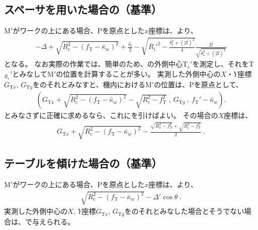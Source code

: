 \subsection{スペーサを用いた場合の\KeywayCenter（\CurvatureCenter 基準）}
\KeywayCenter M$'$がワークの\CenterCurvatureLine 上にある場合、\TableCenter Pを原点とした$x$座標は、より、
\begin{align*}
  -\Delta+\sqrt{R_\mathrm c^2-(f_\mathrm T-\bar\kappa_w)^2}+\frac{\delta_\mathrm s}2
  -\sqrt{R_\mathrm i'^2-\frac{\delta_\mathrm s^2+(2\bar l)^2}4}\frac{2\bar l}{\sqrt{\delta_\mathrm s^2+\left(2\bar l\right)^2}}
\end{align*}
となる。
なお実際の作業では、簡単のため、\TopEndFace の外側中心T$_\mathrm c'$を測定し、それを\TopCurvatureCenter T$_{R_\mathrm c}'$とみなして\KeywayCenter M$'$の位置を計算することが多い。
実測した外側中心の$X$・$Y$座標$G_{\mathrm Tx}$, $G_{\mathrm Ty}$を\TopCurvatureCenter のそれとみなすと、機内における\KeywayCenter M$'$の位置は、\TableCenter Pを原点として、
\begin{align*}
  \left(
    G_{\mathrm Tx}
    +\sqrt{R_\mathrm c^2-(f_\mathrm T-\bar\kappa_w)^2}
    -\sqrt{R_\mathrm c^2-f_\mathrm T^2}\ ,\
    G_{\mathrm Ty}~,~
    f_\mathrm T'-\bar\kappa_w
  \right).
\end{align*}
\TopCurvatureCenter とみなさずに正確に求めるなら、これにを引けばよい。
その場合の$X$座標は、
\begin{align}
  \label{eq:Mreal}
  G_{\mathrm Tx}
  +\sqrt{R_\mathrm c^2-(f_\mathrm T-\bar\kappa_w)^2}
  -\frac{\sqrt{R_\mathrm o^2-f_\mathrm T^2}+\sqrt{R_\mathrm i^2-f_\mathrm T^2}}2\ .
\end{align}


\subsection{テーブルを傾けた場合の\KeywayCenter（\CurvatureCenter 基準）}
\KeywayCenter M$'$がワークの\CenterCurvatureLine 上にある場合、\TableCenter Pを原点とした$x$座標は、より、
\begin{align*}
  \sqrt{R_\mathrm c^2-(f_\mathrm T-\bar\kappa_w)^2}
  -\Delta'\cos\theta\ .
\end{align*}
実測した外側中心の$X$, $Y$座標$G_{\mathrm Tx}$, $G_{\mathrm Ty}$を\TopCurvatureCenter のそれとみなした場合とそうでない場合は、で与えられる。



